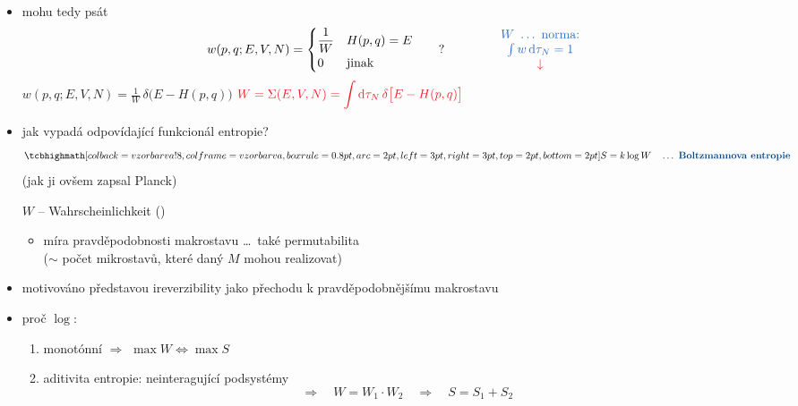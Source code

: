 \begin{itemize}
  \item mohu tedy psát
  \[
    w(p,q;E,V,N) = \begin{cases} \dfrac{1}{W} & H(p,q) = E \\[4pt] 0 & \text{jinak} \end{cases}
    \qquad ?
    \qquad\qquad
    \begin{array}{c}
      \textcolor{NavyBlue}{W\ \dots\ \text{norma:}} \\
      \textcolor{NavyBlue}{\int w\,\dd\tau_N = 1} \\
      \textcolor{Red}{\downarrow}
    \end{array}
  \]
  \textcolor{OliveGreen}{$\displaystyle w(p,q;E,V,N) = \frac1W\,\delta\big(E - H(p,q)\big)$}
  \hfill
  $\textcolor{Red}{\displaystyle W = \Sigma(E,V,N) = \int\dd\tau_N\,\delta\big[E - H(p,q)\big]}$
  \item jak vypadá odpovídající funkcionál entropie?
  \[
    \vzorec{S = k\log W} \quad\dots\ \text{\kw{Boltzmannova entropie}}
  \]
  \hfill (jak ji ovšem zapsal Planck) \hfill\null

  $W$ -- Wahrscheinlichkeit ()
  \begin{itemize}
    \item[--] míra pravděpodobnosti makrostavu \dots\ také permutabilita \\
          ($\sim$ počet mikrostavů, které daný $M$ mohou realizovat)
  \end{itemize}
  \item motivováno představou ireverzibility jako přechodu k pravděpodobnějšímu makrostavu
  \item proč $\log$:
  \begin{enumerate}[label=\arabic*)]
    \item monotónní $\Rightarrow$ $\max W \Leftrightarrow \max S$
    \item aditivita entropie: neinteragující podsystémy
    \[ \Rightarrow\quad W = W_1\cdot W_2 \quad\Rightarrow\quad S = S_1 + S_2 \]
  \end{enumerate}
\end{itemize}


